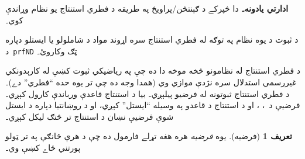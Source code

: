\documentclass[12pt,a4paper,oneside]{report}
\newcommand{\olfileid}[3]{\gdef\pspart{#1}\gdef\pschapter{#2}\gdef\pssection{#3}}
\gdef\pspart{#2}\gdef\pschapter{#3}\gdef\pssection{}%
\theoremstyle{definition}
\newtheorem{defn}[thm]{تعريف}
\newenvironment{editorial}{\begin{framed}\textbf{ادارتي يادونه۔}\enspace}{\end{framed}}
\newenvironment{explain}{}{}
\begin{document}
\label{olpseg:OLP-0084-B004:start}
\label{olpseg:OLP-0084-B004:end}

\label{olpseg:OLP-0084-B005:start}
\begin{editorial}
دا څپرکے د ګېنتڅن/پراويڅ په طريقه د فطري استنتاج يو نظام وړاندې
کوي۔
\label{olpseg:OLP-0084-B005:end}

\label{olpseg:OLP-0084-B006:start}
د ثبوت د يوه نظام په توګه له فطري استنتاج سره اړوند مواد د شاملولو
يا ايستلو دپاره د~\texttt{prfND} ټګ وکاروئ۔
\end{editorial}
\label{olpseg:OLP-0084-B006:end}

\label{olpseg:OLP-0084-B009:start}
%


\label{olpseg:OLP-0084-B009:end}

\label{olpseg:OLP-0084-B012:start}
%


\label{olpseg:OLP-0084-B012:end}

\label{olpseg:OLP-0084-B016:start}
%


\label{olpseg:OLP-0084-B016:end}

\label{olpseg:OLP-0084-B018:start}
%



\label{olpseg:OLP-0084-B018:end}

\label{olpseg:OLP-0085-B004:start}
\olfileid{fol}{ntd}{rul}
\label{olpseg:OLP-0085-B004:end}

\label{olpseg:OLP-0085-B005:start}
\label{olpseg:OLP-0085-B005:end}

\label{olpseg:OLP-0085-B006:start}
\begin{explain}
د فطري استنتاج له نظامونو څخه موخه دا ده چې په رياضيکي ثبوت کښې له
کارېدونکي غيررسمي استدلال سره نژدې موازي وي (همدا وجه ده چې تر يوه
حده “فطري” دے)۔ د فطري استنتاج ثبوتونه له فرضيو پيلېږي۔ بيا د
استنتاج قاعدې ورباندې کارول کېږي۔ فرضيې د~\Intro{\lnot}،
\Intro{\lif}، \Elim{\lor} او \Elim{\lexists} د استنتاج د قاعدو په وسيله “ايستل” کېږي،
او د روښانتيا دپاره د ايستل شوې فرضيې نښان د استنتاج تر
څنګ ليکل کېږي۔
\end{explain}
\label{olpseg:OLP-0085-B006:end}

\label{olpseg:OLP-0085-B007:start}
\begin{defn}[فرضيه]
يوه \emph{فرضيه} هره هغه تړلے فارمول ده چې د هرې څانګې په تر ټولو
پورتني ځاے کښې وي۔
\end{defn}
\label{olpseg:OLP-0085-B007:end}
\end{document}
